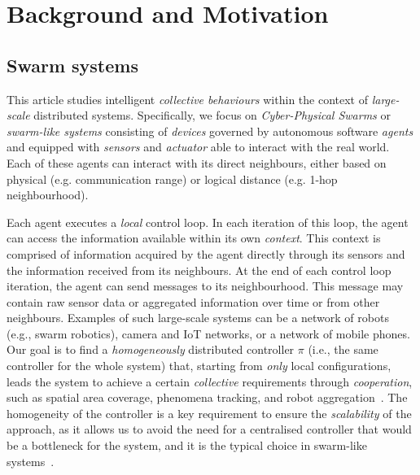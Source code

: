 \documentclass[conference]{IEEEtran}
\begin{document}
\section{Background and Motivation}
\label{sec:background}
\subsection{Swarm systems}
This article studies intelligent \emph{collective behaviours} within the context of \emph{large-scale} distributed systems.
 Specifically, we focus on \emph{Cyber-Physical Swarms} or \emph{swarm-like systems} consisting of \emph{devices} governed by autonomous software \emph{agents} and equipped with \emph{sensors} and \emph{actuator} able to interact with the real world.
 Each of these agents can interact with its direct neighbours, either based on physical (e.g. communication range) or logical distance (e.g. 1-hop neighbourhood).
 
%
Each agent
 executes a \emph{local} control loop. 
 In each iteration of this loop, the agent can access the information available within its own \emph{context}. 
 This context is comprised of information acquired by the agent directly through its sensors and the information received from its neighbours. 
%
At the end of each control loop iteration, 
 the agent can send messages to its neighbourhood. 
 This message may contain raw sensor data or aggregated information over time or from other neighbours.
%
Examples of such large-scale systems can be a network of robots (e.g., swarm robotics), camera and IoT networks, or a network of mobile phones.
%
Our goal is to find a \emph{homogeneously} distributed controller $\pi$ (i.e., the same controller for the whole system) that, 
 starting from \emph{only} local configurations, leads 
 the system to achieve a certain \emph{collective} requirements through \emph{cooperation}, 
 such as spatial area coverage, phenomena tracking, and robot aggregation~\cite{DBLP:journals/firai/SchranzUSE20}.
%
The homogeneity of the controller is a key requirement to ensure the \emph{scalability} of the approach, 
 as it allows us to avoid the need for a centralised controller that would be a bottleneck for the system,
 and it is the typical choice in swarm-like systems~\cite{brambilla2013swarm,yang2021many,pmlr-v80-yang18d,DBLP:conf/aaai/ZhengYCZZWY18}.
%
\end{document}
